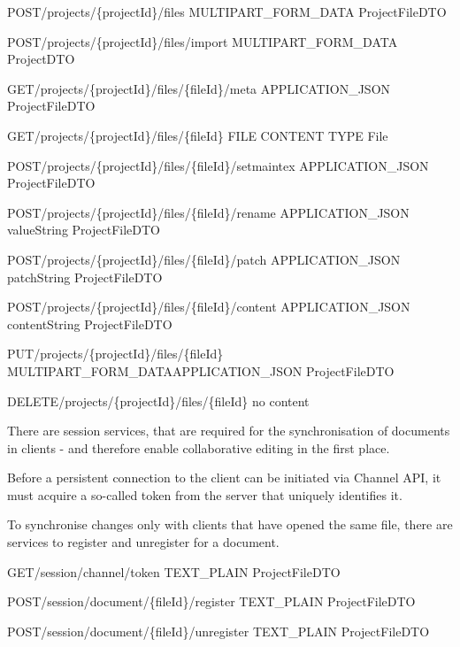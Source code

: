 {POST}{/projects/\{projectId\}/files}
{MULTIPART\_FORM\_DATA}{}
{ProjectFileDTO}

{POST}{/projects/\{projectId\}/files/import}
{MULTIPART\_FORM\_DATA}{}
{ProjectDTO}

{GET}{/projects/\{projectId\}/files/\{fileId\}/meta}
{}{APPLICATION\_JSON}
{ProjectFileDTO}

{GET}{/projects/\{projectId\}/files/\{fileId\}}
{}{FILE CONTENT TYPE}
{File}

{POST}{/projects/\{projectId\}/files/\{fileId\}/setmaintex}
{}{APPLICATION\_JSON}
{ProjectFileDTO}

{POST}{/projects/\{projectId\}/files/\{fileId\}/rename}
{}{APPLICATION\_JSON}
{value}{String}
{ProjectFileDTO}

{POST}{/projects/\{projectId\}/files/\{fileId\}/patch}
{}{APPLICATION\_JSON}
{patch}{String}
{ProjectFileDTO}

{POST}{/projects/\{projectId\}/files/\{fileId\}/content}
{}{APPLICATION\_JSON}
{content}{String}
{ProjectFileDTO}    

{PUT}{/projects/\{projectId\}/files/\{fileId\}}
{MULTIPART\_FORM\_DATA}{APPLICATION\_JSON}
{ProjectFileDTO}

{DELETE}{/projects/\{projectId\}/files/\{fileId\}}
{}{}
{no content}


There are session services, that are required for the synchronisation of documents in clients - and therefore enable collaborative editing in the first place.

Before a persistent connection to the client can be initiated via Channel API, it must acquire a so-called token from the server that uniquely identifies it.

To synchronise changes only with clients that have opened the same file, there are services to register and unregister for a document.

{GET}{/session/channel/token}
{}{TEXT\_PLAIN}
{ProjectFileDTO}

{POST}{/session/document/\{fileId\}/register}
{}{TEXT\_PLAIN}
{ProjectFileDTO}

{POST}{/session/document/\{fileId\}/unregister}
{}{TEXT\_PLAIN}
{ProjectFileDTO}

